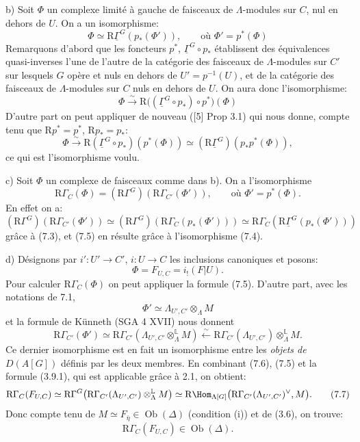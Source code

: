 b) Soit $\Phi$ un complexe limité à gauche de faisceaux de $\Lambda$-modules sur $C$, nul en dehors de $U$. On a un isomorphisme:
\[
\Phi\simeq \mathrm{R}\underline{\Gamma}^G(p_*(\Phi')),
\qquad\text{où } \Phi'=p^*(\Phi)
\tag{7.4}
\]
Remarquons d'abord que les foncteurs $p^*$, $\underline{\Gamma}^G\circ p_*$ établissent des équivalences quasi-inverses l'une de l'autre de la catégorie des faisceaux de $\Lambda$-modules sur $C'$ sur lesquels $G$ opère et nuls en dehors de $U'=p^{-1}(U)$, et de la catégorie des faisceaux de $\Lambda$-modules sur $C$ nuls en dehors de $U$. On aura donc l'isomorphisme:
\[
\Phi\xrightarrow{\sim} \mathrm{R}\bigl((\underline{\Gamma}^G\circ p_*)\circ p^*\bigr)(\Phi)
\]
D'autre part on peut appliquer de nouveau ([5] Prop 3.1) qui nous donne, compte tenu que $\mathrm{R} p^*=p^*$, $\mathrm{R} p_*=p_*$:
\[
\Phi\xrightarrow{\sim} \mathrm{R}(\underline{\Gamma}^G\circ p_*)(p^*(\Phi))
\simeq (\mathrm{R}\underline{\Gamma}^G)(p_*p^*(\Phi)),
\]
ce qui est l'isomorphisme voulu.

c) Soit $\Phi$ un complexe de faisceaux comme dans b). On a l'isomorphisme
\[
\mathrm{R}\Gamma_C(\Phi)=(\mathrm{R}\Gamma^G)(\mathrm{R}\Gamma_{C'}(\Phi')),
\qquad\text{où } \Phi'=p^*(\Phi).
\tag{7.5}
\]
En effet on a:
\[
(\mathrm{R}\Gamma^G)(\mathrm{R}\Gamma_{C'}(\Phi'))
\simeq
(\mathrm{R}\Gamma^G)(\mathrm{R}\Gamma_C(p_*(\Phi')))
\simeq
\mathrm{R}\Gamma_C(\mathrm{R}\underline{\Gamma}^G(p_*(\Phi')))
\]
grâce à (7.3), et (7.5) en résulte grâce à l'isomorphisme (7.4).

d) Désignons par $i':U'\to C'$, $i:U\to C$ les inclusions canoniques et posons:
\[
\Phi=F_{U,C}=i_!(F|U).
\]
Pour calculer $\mathrm{R}\Gamma_C(\Phi)$ on peut appliquer la formule (7.5). D'autre part, avec les notations de 7.1,
\[
\Phi'\simeq \Lambda_{U',C'}\otimes_\Lambda M
\]
et la formule de Künneth (SGA 4 XVII) nous donnent
\[
\mathrm{R}\Gamma_{C'}(\Phi')
\simeq
\mathrm{R}\Gamma_{C'}(\Lambda_{U',C'}\otimes_\Lambda^{\mathbb{L}} M)
\xleftarrow{\sim}
\mathrm{R}\Gamma_{C'}(\Lambda_{U',C'})\otimes_\Lambda^{\mathbb{L}} M.
\tag{7.6}
\]
Ce
dernier isomorphisme est en fait un isomorphisme entre les \emph{objets de} $D(A[G])$ définis par les deux membres. En combinant (7.6), (7.5) et la formule (3.9.1), qui est applicable grâce à 2.1, on obtient:
\[
\mathrm{R}\Gamma_C(F_{U,C})
\simeq
\mathrm{R}\Gamma^G\bigl(\mathrm{R}\Gamma_{C'}(\Lambda_{U',C'})\otimes_\Lambda^{\mathbb{L}} M\bigr)
\simeq
\mathrm{R}\Hom_{\Lambda[G]}\bigl(\mathrm{R}\Gamma_{C'}(\Lambda_{U',C'})^\vee,M\bigr).
\tag{7.7}
\]
Donc compte tenu de $M\simeq F_{\bar\eta}\in\operatorname{Ob}(\Delta)$ (condition (i)) et de (3.6), on trouve:
\[
\mathrm{R}\Gamma_C(F_{U,C})\in\operatorname{Ob}(\Delta).
\]

